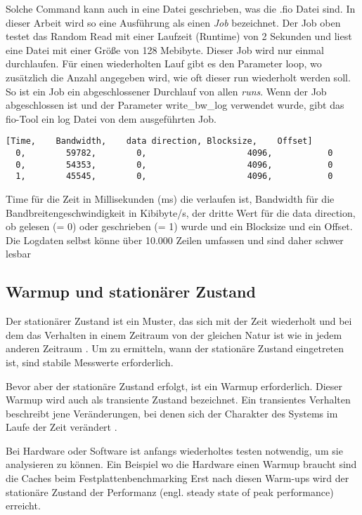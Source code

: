 Solche Command kann auch in eine Datei geschrieben, was die .fio Datei sind. In dieser Arbeit wird so eine Ausführung als einen \textit{Job} bezeichnet.
Der Job oben testet das Random Read mit einer Laufzeit (Runtime) von 2 Sekunden und liest eine Datei mit einer Größe von 128 Mebibyte. Dieser Job wird nur einmal durchlaufen. 
Für einen wiederholten Lauf gibt es den Parameter loop, wo zusätzlich die Anzahl angegeben wird, wie oft dieser run wiederholt werden soll.
So ist ein Job ein abgeschlossener Durchlauf von allen \textit{runs}.
Wenn der Job abgeschlossen ist und der Parameter write\_bw\_log verwendet wurde, gibt das fio-Tool ein log Datei von dem ausgeführten Job.

\begin{lstlisting}[caption=Erste Zeilen des Logs (Bezeichnungen sind nicht im Log enthalten),label={lst:log_line_example}]
  [Time,	Bandwidth,    data direction, Blocksize,	Offset]
  0, 	    59782,        0,		            4096,		    0
  0, 	    54353,        0,		            4096,		    0
  1, 	    45545,        0,		            4096,		    0
\end{lstlisting}

Time für die Zeit in Millisekunden (ms) die verlaufen ist, Bandwidth für die
Bandbreitengeschwindigkeit in Kibibyte/s, der dritte Wert für die data direction,
 ob gelesen (= 0) oder geschrieben (= 1) wurde und ein Blocksize und
ein Offset. Die Logdaten selbst könne über 10.000 Zeilen umfassen und sind
daher schwer lesbar

\subsection{Warmup und stationärer Zustand}
Der stationärer Zustand ist ein Muster, das sich mit der Zeit wiederholt und bei dem das Verhalten in einem Zeitraum von der 
gleichen Natur ist wie in jedem anderen Zeitraum \cite{transient_state_definition}. Um zu ermitteln,
wann der stationäre Zustand eingetreten ist, sind stabile Messwerte erforderlich.

Bevor aber der stationäre Zustand erfolgt, ist ein Warmup erforderlich.
Dieser Warmup wird auch als transiente Zustand bezeichnet.
Ein transientes Verhalten beschreibt jene Veränderungen, bei denen sich der Charakter des Systems im Laufe der Zeit verändert \cite{transient_state_definition}.

Bei Hardware oder Software ist anfangs wiederholtes testen notwendig, um
sie analysieren zu können. 
Ein Beispiel wo die Hardware einen Warmup braucht sind die Caches beim Festplattenbenchmarking \cite{nine-year-of-bench}
Erst nach diesen Warm-ups wird der
stationäre Zustand der Performanz (engl. steady state of peak performance)
erreicht.

